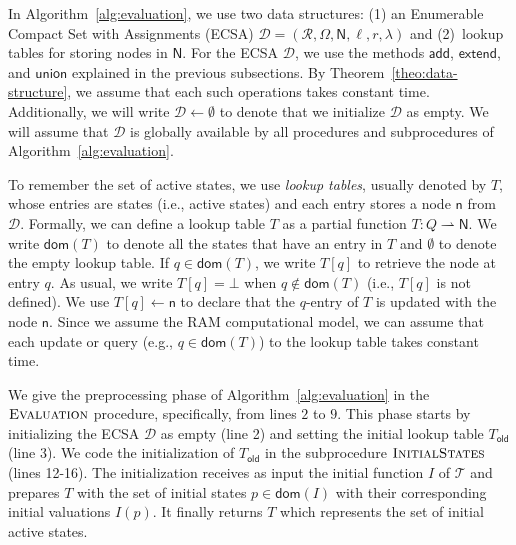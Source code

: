 \documentclass[
a4paper
]{article}
\theoremstyle{plain}
\theoremstyle{definition}
\theoremstyle{remark}
\newcommand{\dom}{\operatorname{dom}}
\newcommand{\pmap}{\rightharpoonup}
\newcommand{\Reg}{\mathcal{R}}
\newcommand{\nsst}{\mathcal{T}}
\newcommand{\D}{\mathcal{D}}
\newcommand{\n}{\textsf{n}}
\newcommand{\N}{\textsf{N}}
\newcommand{\dadd}{\operatorname{add}}
\newcommand{\dunion}{\operatorname{union}}
\newcommand{\dextend}{\operatorname{extend}}
\newcommand{\Told}{T_{\operatorname{old}}}
\renewcommand{\operatorname}[1]{\textsf{#1}}
\begin{document}
In Algorithm~\ref{alg:evaluation}, we use two data structures: (1) an Enumerable Compact Set with Assignments (ECSA) $\D = (\Reg, \Omega, \N, \ell, r, \lambda)$ and (2)~lookup tables for storing nodes in $\N$.
For the ECSA $\D$, we use the methods $\dadd$, $\dextend$, and $\dunion$ explained in the previous subsections. By Theorem~\ref{theo:data-structure}, we assume that each such operations takes constant time. Additionally, we will write $\D \gets \emptyset$ to denote that we initialize $\D$ as empty. 
We will assume that $\D$ is globally available by all procedures and subprocedures of Algorithm~\ref{alg:evaluation}.

To remember the set of active states, we use \emph{lookup tables}, usually denoted by $T$, whose entries are states (i.e., active states) and each entry stores a node $\n$ from $\D$.
Formally, we can define a lookup table $T$ as a partial function $T: Q \pmap \N$. We write $\dom(T)$ to denote all the states that have an entry in $T$ and $\emptyset$ to denote the empty lookup table. If $q\in  \dom(T)$, we write $T[q]$ to retrieve the node at entry $q$. As usual, we write $T[q] = \bot$ when $q \notin \dom(T)$ (i.e., $T[q]$ is not defined). We use $T[q] \gets \n$ to declare that the $q$-entry of $T$ is updated with the node $\n$. Since we assume the RAM computational model, we can assume that each update or query (e.g., $q \in \dom(T)$) to the lookup table takes constant time. 

We give the preprocessing phase of Algorithm~\ref{alg:evaluation} in the $\textproc{Evaluation}$ procedure, specifically, from lines $2$ to $9$. This phase starts by initializing the ECSA $\D$ as empty (line 2) and setting the initial lookup table $\Told$ (line 3). We code the initialization of $\Told$ in the subprocedure $\textproc{InitialStates}$ (lines 12-16). The initialization receives as input the initial function $I$ of $\nsst$ and prepares $T$ with the set of initial states $p \in \dom(I)$ with their corresponding initial valuations $I(p)$. It finally returns $T$ which represents the set of initial active states. 
\end{document}
